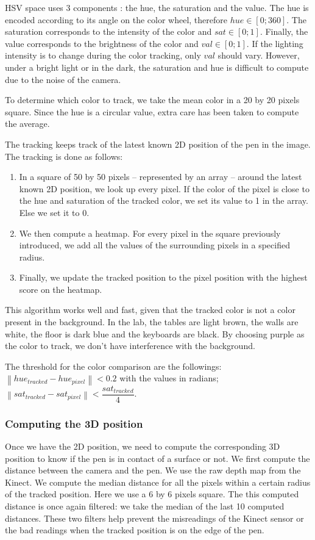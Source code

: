 \documentclass[12pt]{article}
\begin{document}
HSV space uses 3 components : the hue, the saturation and the value. The hue is encoded according to its angle on the color wheel, therefore $hue \in [0;360]$. The saturation corresponds to the intensity of the color and $sat \in [0;1]$. Finally, the value corresponds to the brightness of the color and $val \in [0;1]$. If the lighting intensity is to change during the color tracking, only $val$ should vary. However, under a bright light or in the dark, the saturation and hue is difficult to compute due to the noise of the camera.

To determine which color to track, we take the mean color in a 20 by 20 pixels square. Since the hue is a circular value, extra care has been taken to compute the average.

The tracking keeps track of the latest known 2D position of the pen in the image. The tracking is done as follows:
\begin{enumerate}
\item In a square of 50 by 50 pixels -- represented by an array -- around the latest known 2D position, we look up every pixel. If the color of the pixel is close to the hue and saturation of the tracked color, we set its value to 1 in the array. Else we set it to 0.
\item We then compute a heatmap. For every pixel in the square previously introduced, we add all the values of the surrounding pixels in a specified radius.
\item Finally, we update the tracked position to the pixel position with the highest score on the heatmap.
\end{enumerate}

This algorithm works well and fast, given that the tracked color is not a color present in the background. In the lab, the tables are light brown, the walls are white, the floor is dark blue and the keyboards are black. By choosing purple as the color to track, we don't have interference with the background.

The threshold for the color comparison are the followings: $\left\| hue_{tracked} - hue_{pixel}\right\| < 0.2$ with the values in radians; $\left\| sat_{tracked} - sat_{pixel}\right\| < \dfrac{sat_{tracked}}{4}$.

\subsubsection{Computing the 3D position}
Once we have the 2D position, we need to compute the corresponding 3D position to know if the pen is in contact of a surface or not. We first compute the distance between the camera and the pen. We use the raw depth map from the Kinect. We compute the median distance for all the pixels within a certain radius of the tracked position. Here we use a 6 by 6 pixels square. The this computed distance is once again filtered: we take the median of the last 10 computed distances. These two filters help prevent the misreadings of the Kinect sensor or the bad readings when the tracked position is on the edge of the pen.
\end{document}
